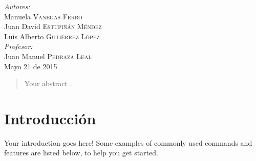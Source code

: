 \documentclass[12pt]{article}
\begin{document}
\begin{titlepage}
\Large \emph{Autores:}\\
Manuela \textsc{Vanegas Ferro}\\
Juan David \textsc{Estupi\~n\'an M\'endez}\\
Luis Alberto \textsc{Guti\'errez L\'opez}\\[2cm]

\Large \emph{Profesor:}\\
Juan Manuel \textsc{Pedraza Leal}\\[3cm]


{\large Mayo 21 de 2015}\\[2cm] %


 

\vfill %

\end{titlepage}

\tableofcontents
\pagebreak

\begin{abstract}
Your abstract\cite{kressler01} \cite{cleland67} \cite{turlings95} \cite{sallaud09} \cite {kirby09} \cite{harada09a} \cite{harada09b} \cite{crocker80} \cite{engerberg-kulka04} \cite {alon06}.
\end{abstract}

\section{Introducci\'on}

Your introduction goes here! Some examples of commonly used commands and features are listed below, to help you get started.
\end{document}
